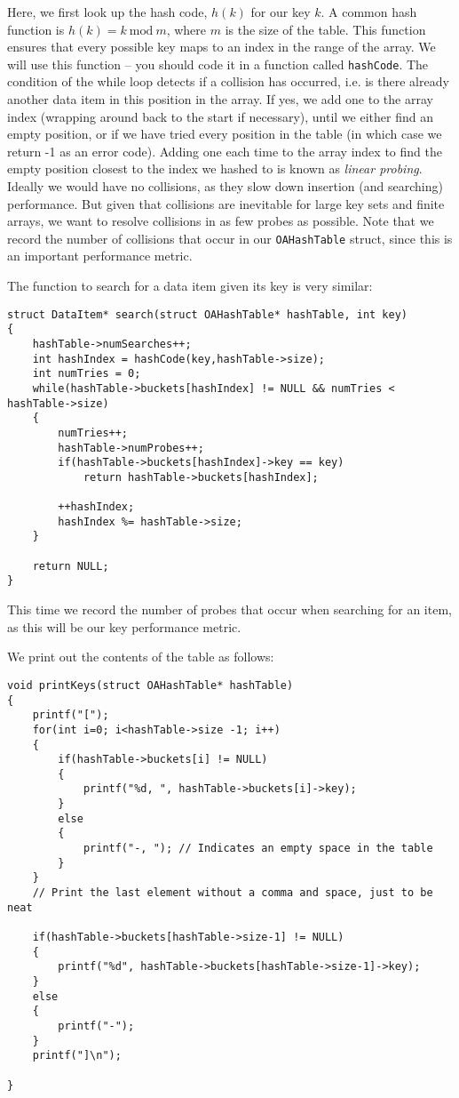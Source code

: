 \documentclass[10pt, a4paper, twosize]{article}
\begin{document}
Here, we first look up the hash code, $h(k)$ for our key $k$. A common hash function is $h(k) = k \: \mathrm{mod} \: m$, where $m$ is the size of the table. This function ensures that every possible key maps to an index in the range of the array. We will use this function -- you should code it in a function called \texttt{hashCode}. The condition of the while loop detects if a collision has occurred, i.e. is there already another data item in this position in the array. If yes, we add one to the array index (wrapping around back to the start if necessary), until we either find an empty position, or if we have tried every position in the table (in which case we return -1 as an error code). Adding one each time to the array index to find the empty position closest to the index we hashed to is known as \emph{linear probing}. Ideally we would have no collisions, as they slow down insertion (and searching) performance. But given that collisions are inevitable for large key sets and finite arrays, we want to resolve collisions in as few probes as possible. Note that we record the number of collisions that occur in our \texttt{OAHashTable} struct, since this is an important performance metric.

The function to search for a data item given its key is very similar:
\begin{lstlisting}
struct DataItem* search(struct OAHashTable* hashTable, int key)
{
    hashTable->numSearches++;
    int hashIndex = hashCode(key,hashTable->size);
    int numTries = 0;
    while(hashTable->buckets[hashIndex] != NULL && numTries < hashTable->size)
    {
        numTries++;
        hashTable->numProbes++;
        if(hashTable->buckets[hashIndex]->key == key)
            return hashTable->buckets[hashIndex];
        
        ++hashIndex;
        hashIndex %= hashTable->size;
    }
    
    return NULL;
}
\end{lstlisting}
This time we record the number of probes that occur when searching for an item, as this will be our key performance metric.

We print out the contents of the table as follows:
\begin{lstlisting}
void printKeys(struct OAHashTable* hashTable)
{
    printf("[");
    for(int i=0; i<hashTable->size -1; i++)
    {
        if(hashTable->buckets[i] != NULL)
        {
            printf("%d, ", hashTable->buckets[i]->key);
        }
        else
        {
            printf("-, "); // Indicates an empty space in the table
        }
    }
    // Print the last element without a comma and space, just to be neat
    
    if(hashTable->buckets[hashTable->size-1] != NULL)
    {
        printf("%d", hashTable->buckets[hashTable->size-1]->key);
    }
    else
    {
        printf("-"); 
    }
    printf("]\n");
    
}
\end{lstlisting}
\end{document}
